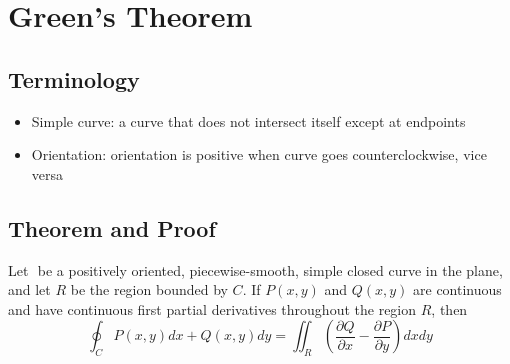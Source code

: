 \documentclass[12pt]{article}
\begin{document}
\section{Green's Theorem}

\subsection{Terminology}

\begin{itemize}
	\item Simple curve: a curve that does not intersect itself except at endpoints \\
	\item Orientation: orientation is positive when curve goes counterclockwise, vice versa
\end{itemize}

\subsection{Theorem and Proof}

\begin{thm}
	Let $ $ be a positively oriented, piecewise-smooth, simple closed curve in the plane, and let $R$ be the region bounded by $C$. If $P(x,y)$ and $Q(x,y)$ are continuous and have continuous first partial derivatives throughout the region $R$, then
	$$\oint_C P(x,y)dx + Q(x,y)dy = \iint_R \left(\frac{\partial Q}{\partial x} - \frac{\partial P}{\partial y}\right) dxdy$$
\end{thm}
\end{document}
